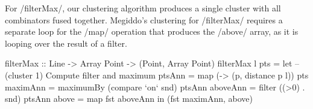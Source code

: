 For \Hs/filterMax/, our clustering algorithm produces a single cluster with all combinators fused together.
Megiddo's clustering for \Hs/filterMax/ requires a separate loop for the \Hs/map/ operation that produces the \Hs/above/ array, as it is looping over the result of a filter.



\begin{haskell}[float,caption=Quickhull core (\Hs/filterMax/) implementation,label=figs:clustering:bench:filterMax]
filterMax :: Line -> Array Point -> (Point, Array Point)
filterMax l pts
 = let -- (cluster 1) Compute filter and maximum 
       ptsAnn   = map (\p -> (p, distance p l)) pts
       maximAnn = maximumBy (compare `on` snd)  ptsAnn
       aboveAnn = filter ((>0) . snd)           ptsAnn
       above    = map fst                       aboveAnn
   in (fst maximAnn, above)
\end{haskell}


